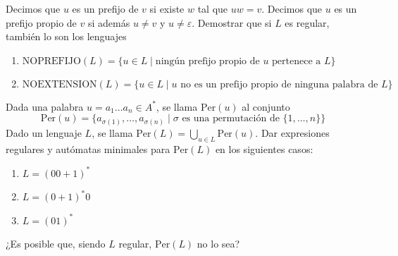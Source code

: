 \begin{ejercicio}
Decimos que $u$ es un prefijo de $v$ si existe $w$ tal que $uw = v$. Decimos que $u$ es un prefijo propio de $v$ si además $u \neq v$ y $u \neq \varepsilon$. Demostrar que si $L$ es regular, también lo son los lenguajes
\begin{enumerate}
    \item $\text{NOPREFIJO}(L) = \{u \in L \mid \text{ningún prefijo propio de } u \text{ pertenece a } L\}$
    \item $\text{NOEXTENSION}(L) = \{u \in L \mid u \text{ no es un prefijo propio de ninguna palabra de } L\}$
\end{enumerate}
\end{ejercicio}

\begin{ejercicio}
Dada una palabra $u = a_1 \ldots a_n \in A^*$, se llama $\text{Per}(u)$ al conjunto
$$\text{Per}(u) = \{a_{\sigma(1)}, \ldots, a_{\sigma(n)} \mid \sigma \text{ es una permutación de } \{1, \ldots, n\}\}$$
Dado un lenguaje $L$, se llama $\text{Per}(L) = \bigcup_{u \in L} \text{Per}(u)$. Dar expresiones regulares y autómatas minimales para $\text{Per}(L)$ en los siguientes casos:
\begin{enumerate}
    \item $L = (00 + 1)^*$
    \item $L = (0 + 1)^*0$
    \item $L = (01)^*$
\end{enumerate}
¿Es posible que, siendo $L$ regular, $\text{Per}(L)$ no lo sea?
\end{ejercicio}
